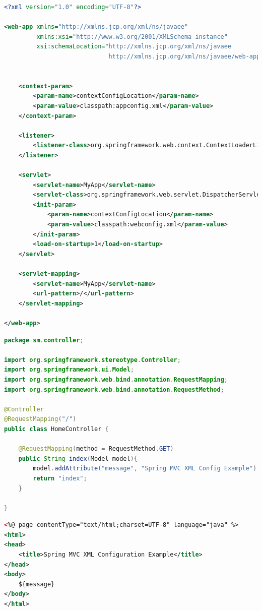 \begin{lstlisting}[language=xml,title=src/main/webapp/WEB-INF/web.xml]
<?xml version="1.0" encoding="UTF-8"?>

<web-app xmlns="http://xmlns.jcp.org/xml/ns/javaee"
         xmlns:xsi="http://www.w3.org/2001/XMLSchema-instance"
         xsi:schemaLocation="http://xmlns.jcp.org/xml/ns/javaee
                             http://xmlns.jcp.org/xml/ns/javaee/web-app_3_1.xsd" version="3.1">


    <context-param>
        <param-name>contextConfigLocation</param-name>
        <param-value>classpath:appconfig.xml</param-value>
    </context-param>

    <listener>
        <listener-class>org.springframework.web.context.ContextLoaderListener</listener-class>
    </listener>

    <servlet>
        <servlet-name>MyApp</servlet-name>
        <servlet-class>org.springframework.web.servlet.DispatcherServlet</servlet-class>
        <init-param>
            <param-name>contextConfigLocation</param-name>
            <param-value>classpath:webconfig.xml</param-value>
        </init-param>
        <load-on-startup>1</load-on-startup>
    </servlet>

    <servlet-mapping>
        <servlet-name>MyApp</servlet-name>
        <url-pattern>/</url-pattern>
    </servlet-mapping>

</web-app>
\end{lstlisting}


\begin{lstlisting}[language=java,title=src/main/java/sm/controller/AppMain.java]
package sm.controller;

import org.springframework.stereotype.Controller;
import org.springframework.ui.Model;
import org.springframework.web.bind.annotation.RequestMapping;
import org.springframework.web.bind.annotation.RequestMethod;

@Controller
@RequestMapping("/")
public class HomeController {

    @RequestMapping(method = RequestMethod.GET)
    public String index(Model model){
        model.addAttribute("message", "Spring MVC XML Config Example");
        return "index";
    }

}
\end{lstlisting}


\begin{lstlisting}[language=xml,title=src/main/webapp/WEB-INF/views/index.jsp]
<%@ page contentType="text/html;charset=UTF-8" language="java" %>
<html>
<head>
    <title>Spring MVC XML Configuration Example</title>
</head>
<body>
    ${message}
</body>
</html>
\end{lstlisting}

